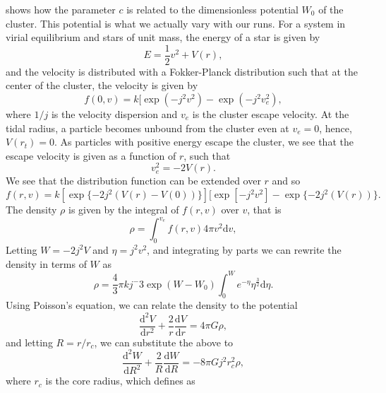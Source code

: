 \documentclass{princeton_astro_thesis}
\numberwithin{equation}{section}
\begin{document}
 \citet{1966King} shows how the parameter $c$ is related to the dimensionless potential $W_{0}$ of the cluster.  This potential is what we actually vary with our runs. For a system in virial equilibrium and stars of unit mass, the energy of a star is given by
\begin{equation}
    E = \frac{1}{2}v^2 + V(r),
\end{equation}
and the velocity is distributed with a Fokker-Planck distribution such that at the center of the cluster, the velocity is given by
\begin{equation}
    f(0,v) = k [\exp(-j^2v^2) - \exp(-j^2v^{2}_{e}),
\end{equation}
where $1/j$ is the velocity dispersion and $v_{e}$ is the cluster escape velocity.  At the tidal radius, a particle becomes unbound from the cluster even at $v_{e} = 0$, hence, $V(r_{t}) = 0$.  As particles with positive energy escape the cluster, we see that the escape velocity is given as a function of $r$, such that
\begin{equation}
v_{e}^{2} = -2V(r).
\end{equation}
We see that the distribution function can be extended over $r$ and so
\begin{equation}
    f(r, v) = k[\exp\{-2j^2(V(r)-V(0))\}][\exp[-j^2v^2] - \exp\{-2j^2(V(r))\}.
\end{equation}
The density $\rho$ is given by the integral of $f(r,v)$ over $v$, that is
\begin{equation}
    \rho = \int_{0}^{v_{e}} f(r,v) 4 \pi v^2 \mathrm{d}v,
    \label{eqn:kingrho}
\end{equation}
Letting $W = -2j^2V$ and $\eta = j^2v^2$, and integrating by parts we can rewrite the density in terms of $W$ as
\begin{equation}
\rho = \frac{4}{3}\pi k j^-3 \exp(W-W_{0}) \int_{0}^{W} e^{-\eta} \eta^\frac{3}{2} \mathrm{d}\eta.
\end{equation}
Using Poisson's equation, we can relate the density to the potential
\begin{equation}
\frac{\mathrm{d}^2V}{\mathrm{d}r^2} + \frac{2}{r}\frac{\mathrm{d}V}{\mathrm{d}r} = 4 \pi G \rho,
\end{equation}
and letting $R = r/r_c$, we can substitute the above to
\begin{equation}
\frac{\mathrm{d}^2W}{\mathrm{d}R^2} + \frac{2}{R}\frac{\mathrm{d}W}{\mathrm{d}R} = -8 \pi G j^2 r_{c}^2 \rho,
\label{eqn:kingpoisson}
\end{equation}
where $r_{c}$ is the core radius, which \citet{1966King} defines as
\end{document}
